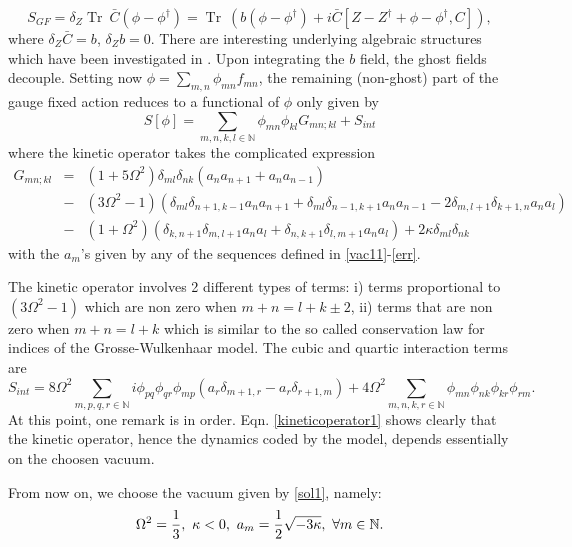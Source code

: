 \documentclass[a4paper,11pt,twoside]{article}
\numberwithin{equation}{section}
\DeclareMathOperator{\tr}{Tr}
\theoremstyle{nonumberplain}
\newcounter{and}
\begin{document}
\begin{equation}
S_{GF}=\delta_Z\tr\ {\bar{C}}(\phi-\phi^\dag)=\tr\ ( b(\phi-\phi^\dag)+i{\bar{C}}[Z-Z^\dag+\phi-\phi^\dag,C])\label{gaugefixingphi},
\end{equation}
where $\delta_Z{\bar{C}}=b$, $\delta_Zb=0$. There are interesting underlying algebraic structures which have been investigated in \cite{rsw}. Upon integrating the $b$ field, the ghost fields decouple. Setting now $\phi=\sum_{m,n}\phi_{mn}f_{mn}$, the remaining (non-ghost) part of the gauge fixed action reduces to a functional of $\phi$ only given by
\begin{equation}
S[\phi]=\sum_{m,n,k,l\in\mathbb{N}} \phi_{mn}\phi_{kl}G_{mn;kl}+S_{int}\label{actmatrix}
\end{equation}
where the kinetic operator takes the complicated expression
\begin{eqnarray}
G_{mn;kl} &=&(1+5\Omega^2)\delta_{ml}\delta_{nk}(a_na_{n+1}+a_na_{n-1})\nonumber\\
&-&(3\Omega^2-1)(\delta_{ml}\delta_{n+1,k-1}a_na_{n+1}+\delta_{ml}\delta_{n-1,k+1}a_na_{n-1}
-2\delta_{m,l+1}\delta_{k+1,n}a_na_l)\nonumber \\
&-&(1+\Omega^2)(\delta_{k,n+1}\delta_{m,l+1}a_na_l+\delta_{n,k+1}\delta_{l,m+1}a_na_l)+2\kappa\delta_{ml}\delta_{nk}\label{kineticoperator1}
\end{eqnarray}
with the $a_m$'s given by any of the sequences defined in \eqref{vac11}-\eqref{err}. \par
The kinetic operator involves 2 different types of terms: i) terms proportional to $(3\Omega^2-1)$ which are non zero when $m+n=l+k\pm2$, ii) terms that are non zero when $m+n=l+k$ which is similar to the so called conservation law for indices of the Grosse-Wulkenhaar model. The cubic and quartic interaction terms are
\begin{equation}
S_{int}=8\Omega^2\sum_{m,p,q,r\in\mathbb{N}}i\phi_{pq}\phi_{qr}\phi_{mp}(a_r\delta_{m+1,r}-a_r\delta_{r+1,m})+
4\Omega^2\sum_{m,n,k,r\in\mathbb{N}}\phi_{mn}\phi_{nk}\phi_{kr}\phi_{rm}\label{interactmatrix}.
\end{equation}
At this point, one remark is in order. Eqn. \eqref{kineticoperator1} shows clearly that the kinetic operator, hence the dynamics coded by the model, depends essentially on the choosen vacuum.\par
From now on, we choose the vacuum given by \eqref{sol1}, namely: 
\begin{equation}
\Omega^2={{1}\over{3}},\ \kappa<0,\ a_m={{1}\over{2}}{\sqrt{ -3\kappa}},\ \forall m\in\mathbb{N}\nonumber.
\end{equation}
\end{document}
